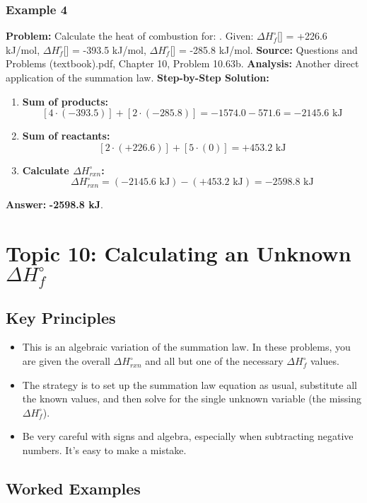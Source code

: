 \documentclass{article}
\begin{document}
\subsubsection{Example 4}
\textbf{Problem:} Calculate the heat of combustion for: .
Given: $\Delta H_f^\circ$[] = +226.6 kJ/mol, $\Delta H_f^\circ$[] = -393.5 kJ/mol, $\Delta H_f^\circ$[] = -285.8 kJ/mol.
\textbf{Source:} Questions and Problems (textbook).pdf, Chapter 10, Problem 10.63b.
\textbf{Analysis:} Another direct application of the summation law.
\textbf{Step-by-Step Solution:}
\begin{enumerate}
    \item \textbf{Sum of products:}
    \[ [4 \cdot (-393.5)] + [2 \cdot (-285.8)] = -1574.0 - 571.6 = -2145.6 \text{ kJ} \]
    \item \textbf{Sum of reactants:}
    \[ [2 \cdot (+226.6)] + [5 \cdot (0)] = +453.2 \text{ kJ} \]
    \item \textbf{Calculate $\Delta H_{rxn}^\circ$:}
    \[ \Delta H_{rxn}^\circ = (-2145.6 \text{ kJ}) - (+453.2 \text{ kJ}) = -2598.8 \text{ kJ} \]
\end{enumerate}
\textbf{Answer:} \textbf{-2598.8 kJ}.

\section{Topic 10: Calculating an Unknown $\Delta H_f^\circ$}
\subsection{Key Principles}
\begin{itemize}
    \item This is an algebraic variation of the summation law. In these problems, you are given the overall $\Delta H_{rxn}^\circ$ and all but one of the necessary $\Delta H_f^\circ$ values.
    \item The strategy is to set up the summation law equation as usual, substitute all the known values, and then solve for the single unknown variable (the missing $\Delta H_f^\circ$).
    \item Be very careful with signs and algebra, especially when subtracting negative numbers. It's easy to make a mistake.
\end{itemize}

\subsection{Worked Examples}
\end{document}
